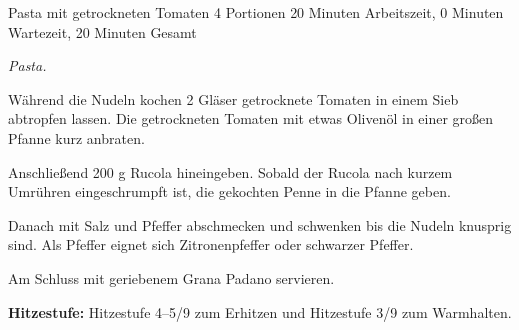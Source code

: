 \begin{recipe}{Pasta mit getrockneten Tomaten} {4 Portionen} {20 Minuten Arbeitszeit, 0 Minuten Wartezeit, 20 Minuten Gesamt}

  \freeform{}\textit{Pasta.}


  Während die Nudeln kochen 2 Gläser getrocknete Tomaten in einem Sieb abtropfen lassen.
  Die getrockneten Tomaten mit etwas Olivenöl in einer großen Pfanne kurz anbraten.


  Anschließend 200 g Rucola hineingeben.
  Sobald der Rucola nach kurzem Umrühren eingeschrumpft ist, die gekochten Penne in die Pfanne geben.


  Danach mit Salz und Pfeffer abschmecken und schwenken bis die Nudeln knusprig sind.
  Als Pfeffer eignet sich Zitronenpfeffer oder schwarzer Pfeffer.

  
  Am Schluss mit geriebenem Grana Padano servieren.

  \freeform{}\hrulefill{}

  \freeform{}\textbf{Hitzestufe:}
  Hitzestufe 4–5/9 zum Erhitzen und Hitzestufe 3/9 zum Warmhalten.

\end{recipe}

